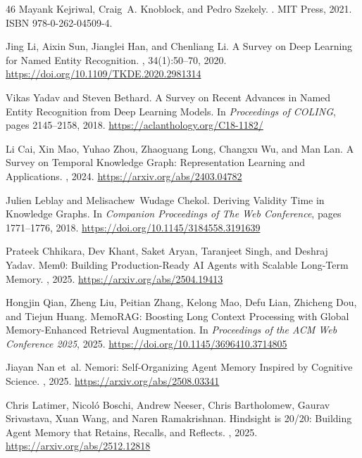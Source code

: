 \documentclass[manuscript,review]{acmart}
\begin{document}
\begin{thebibliography}{46}
Mayank Kejriwal, Craig~A. Knoblock, and Pedro Szekely.
.
\newblock MIT Press, 2021.
\newblock ISBN 978-0-262-04509-4.

Jing Li, Aixin Sun, Jianglei Han, and Chenliang Li.
\newblock A Survey on Deep Learning for Named Entity Recognition.
, 34(1):50--70, 2020.
\newblock \url{https://doi.org/10.1109/TKDE.2020.2981314}

Vikas Yadav and Steven Bethard.
\newblock A Survey on Recent Advances in Named Entity Recognition from Deep Learning Models.
\newblock In {\em Proceedings of COLING}, pages 2145--2158, 2018.
\newblock \url{https://aclanthology.org/C18-1182/}

Li Cai, Xin Mao, Yuhao Zhou, Zhaoguang Long, Changxu Wu, and Man Lan.
\newblock A Survey on Temporal Knowledge Graph: Representation Learning and Applications.
, 2024.
\newblock \url{https://arxiv.org/abs/2403.04782}

Julien Leblay and Melisachew~Wudage Chekol.
\newblock Deriving Validity Time in Knowledge Graphs.
\newblock In {\em Companion Proceedings of The Web Conference}, pages 1771--1776, 2018.
\newblock \url{https://doi.org/10.1145/3184558.3191639}

Prateek Chhikara, Dev Khant, Saket Aryan, Taranjeet Singh, and Deshraj Yadav.
\newblock Mem0: Building Production-Ready AI Agents with Scalable Long-Term Memory.
, 2025.
\newblock \url{https://arxiv.org/abs/2504.19413}

Hongjin Qian, Zheng Liu, Peitian Zhang, Kelong Mao, Defu Lian, Zhicheng Dou, and Tiejun Huang.
\newblock MemoRAG: Boosting Long Context Processing with Global Memory-Enhanced Retrieval Augmentation.
\newblock In {\em Proceedings of the ACM Web Conference 2025}, 2025.
\newblock \url{https://doi.org/10.1145/3696410.3714805}

Jiayan Nan et~al.
\newblock Nemori: Self-Organizing Agent Memory Inspired by Cognitive Science.
, 2025.
\newblock \url{https://arxiv.org/abs/2508.03341}

Chris Latimer, Nicol{\'o} Boschi, Andrew Neeser, Chris Bartholomew, Gaurav Srivastava, Xuan Wang, and Naren Ramakrishnan.
\newblock Hindsight is 20/20: Building Agent Memory that Retains, Recalls, and Reflects.
, 2025.
\newblock \url{https://arxiv.org/abs/2512.12818}


\end{thebibliography}
\end{document}
